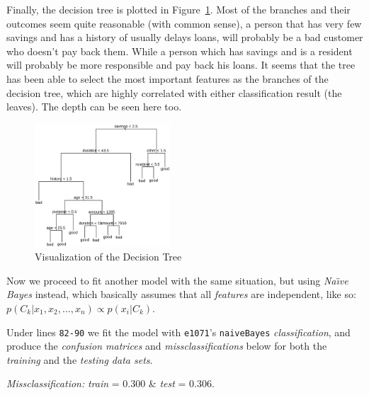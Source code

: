 \documentclass[a4paper, twocolumn]{article}
\begin{document}
        Finally, the decision tree is plotted in Figure~\ref{fig:tree}. Most of the branches and their outcomes seem quite reasonable (with common sense), a person that has very few savings and has a history of usually delays loans, will probably be a bad customer who doesn't pay back them. While a person which has savings and is a resident will probably be more responsible and pay back his loans. It seems that the tree has been able to select the most important features as the branches of the decision tree, which are highly correlated with either classification result (the leaves). The depth can be seen here too.

        \begin{figure}[h!]
            \centering
            \caption{Visualization of the Decision Tree}
            \label{fig:tree}
            \includegraphics[width=0.45\textwidth]{share/tree.eps}
        \end{figure}

        Now we proceed to fit another model with the same situation, but using \emph{Na{\"\i}ve Bayes} instead, which basically assumes that all \emph{features} are independent, like so: $p(C_k | x_1, x_2, ..., x_n) \propto p(x_i | C_k)$.

        Under lines \texttt{82-90} we fit the model with \texttt{e1071}'s \texttt{naiveBayes} \emph{classification}, and produce the \emph{confusion matrices} and \emph{missclassifications} below for both the \emph{training} and the \emph{testing data sets}.

        \emph{Missclassification:} \emph{train} = 0.300 \& \emph{test} = 0.306.
\end{document}
